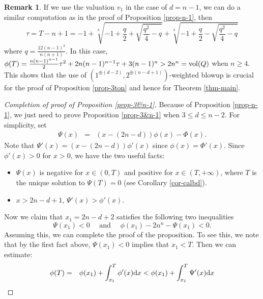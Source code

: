 \documentclass[12pt]{amsart}
\theoremstyle{definition}
\newtheorem{rmk}[thm]{Remark}
\def\dif{{\rm d}}
\def\vol{{\rm vol}}
\begin{document}
\begin{rmk}\label{rmk-12}
     If we use the valuation $v_1$ in the case of $d=n-1$, we can do a similar computation as in the proof of Proposition \ref{prop-n-1}, then
     $$
     \tau=T-n+1=-1+\sqrt[3]{-1+\frac{q}{2}+\sqrt{\frac{q^2}{4}-q}}+\sqrt[3]{-1+\frac{q}{2}-\sqrt{\frac{q^2}{4}-q}}
     $$
     where $q=\frac{12(n-1)^2}{n(n+1)}$. In this case, $\phi(T)=\frac{n(n-1)^{n-1}}{2}\tau^2+2n(n-1)^{n-1}\tau+3(n-1)^n>2n^n=\vol(Q)$ when $n\geq 4$. This shows that the use of $(1^{\oplus(d-2)},2^{\oplus(n-d+1)})$-weighted blowup is crucial for the proof of Proposition \ref{prop-3ton} and hence for Theorem \ref{thm-main}. 
\end{rmk}


    \begin{proof}[Completion of proof of Proposition \ref{prop-3&n-1}]
Because of Proposition \ref{prop-n-1}, we just need to prove Proposition \ref{prop-3&n-1} when $3\le d\le n-2$. For simplicity, set
\begin{eqnarray}\label{eq-Psi}
    \Psi(x)&=&(x-(2n-d))\phi(x)-\Phi(x). 
\end{eqnarray}
Note that $\Psi'(x)=(x-(2n-d))\phi'(x)$ since $\phi(x)=\Phi'(x)$. Since $\phi'(x)>0$ for $x>0$, we have the two useful facts:
\begin{itemize}
     \item $\Psi(x)$ is negative for $x\in (0, T)$ and positive for $x\in (T, +\infty)$, where $T$ is the unique solution to $\Psi(T)=0$ (see Corollary \ref{cor-calbd}).  
    \item $x>2n-d+1$, $\Psi'(x)>\phi'(x)$.
\end{itemize} 
Now we claim that $x_1=2n-d+2$ satisfies the following two inequalities
   \begin{equation}\label{eq-goal0} 
   \Psi(x_1)<0 \quad \text{ and } \quad 
   \phi(x_1)-2n^n-\Psi(x_1)<0.
   \end{equation} 
Assuming this, we can complete the proof of the proposition. To see this, we note that by the first fact above, $\Psi(x_1)<0$ implies that $x_1<T$. Then we can estimate:
   \begin{eqnarray*}
    \phi(T)&=&\phi(x_1)+\int_{x_1}^T \phi'(x)\dif x<\phi(x_1)+\int_{x_1}^T\Psi'(x)\dif x\\

\end{eqnarray*}
\end{proof}
\end{document}
